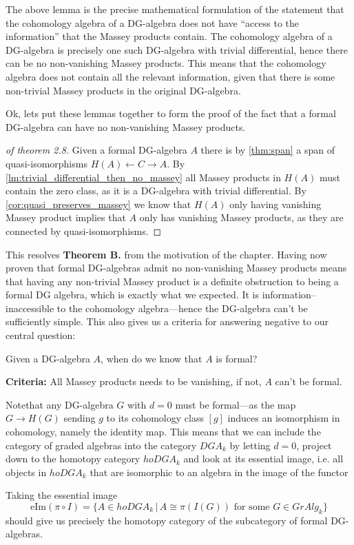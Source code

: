 The above lemma is the precise mathematical formulation of the statement that the cohomology algebra of a DG-algebra does not have ``access to the information'' that the Massey products contain. The cohomology algebra of a DG-algebra is precisely one such DG-algebra with trivial differential, hence there can be no non-vanishing Massey products. This means that the cohomology algebra does not contain all the relevant information, given that there is some non-trivial Massey products in the original DG-algebra. 

Ok, lets put these lemmas together to form the proof of the fact that a formal DG-algebra can have no non-vanishing Massey products. 

\begin{proof}[of theorem 2.8]
Given a formal DG-algebra $A$ there is by \ref{thm:span} a span of quasi-isomorphisms $H(A)\longleftarrow C\longrightarrow A$. By \cref{lm:trivial_differential_then_no_massey} all Massey products in $H(A)$ must contain the zero class, as it is a DG-algebra with trivial differential. By \cref{cor:quasi_preserves_massey} we know that $H(A)$ only having vanishing Massey product implies that $A$ only has vanishing Massey products, as they are connected by quasi-isomorphisms. 
\end{proof}

This resolves \textbf{Theorem B.} from the motivation of the chapter. Having now proven that formal DG-algebras admit no non-vanishing Massey products means that having any non-trivial Massey product is a definite obstruction to being a formal DG algebra, which is exactly what we expected. It is information--inaccessible to the cohomology algebra---hence the DG-algebra can't be sufficiently simple. This also 	gives us a criteria for answering negative to our central question: 

\begin{central}
Given a DG-algebra $A$, when do we know that $A$ is formal?
\end{central}
\textbf{Criteria:} All Massey products needs to be vanishing, if not, $A$ can't be formal. 

Notethat any DG-algebra $G$ with $d=0$ must be formal---as the map $G\longrightarrow H(G)$ sending $g$ to its cohomology class $[g]$ induces an isomorphism in cohomology, namely the identity map. This means that we can include the category of graded algebras into the category $DGA_k$ by letting $d=0$, project down to the homotopy category $hoDGA_k$ and look at its essential image, i.e. all objects in $hoDGA_k$ that are isomorphic to an algebra in the image of the functor
\begin{center}
\end{center}
Taking the essential image
\begin{equation*}
    \text{eIm}(\pi\circ I) = \{A\in hoDGA_k \,\vert\, A\cong \pi( I(G)) \text{ for some } G\in GrAlg_k\}
\end{equation*}
should give us precisely the homotopy category of the subcategory of formal DG-algebras. 

